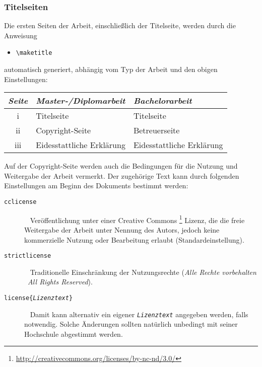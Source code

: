 \subsubsection{Titelseiten}

Die ersten Seiten der Arbeit, einschließlich der Titelseite,
werden durch die Anweisung
\begin{itemize}
\item[] \verb!\maketitle!  
\end{itemize}
automatisch generiert, abhängig vom Typ der Arbeit und den obigen
Einstellungen:
%
\begin{center}
\begin{tabular}{cll}
\emph{Seite} & \emph{Master-/Diplomarbeit} & \emph{Bachelorarbeit} \\
  \hline
  {\rm i} & Titelseite & Titelseite \\
  {\rm ii} & Copyright-Seite & Betreuerseite \\
  {\rm iii} & Eidesstattliche Erklärung & Eidesstattliche Erklärung \\
  \hline
\end{tabular}
\end{center}
%
Auf der Copyright-Seite werden auch die Bedingungen für die Nutzung 
und Weitergabe der Arbeit vermerkt. Der zugehörige Text kann durch
folgenden Einstellungen am Beginn des Dokuments bestimmt werden:
%
\begin{description}
\item[\normalfont\texttt{{\bs}cclicense}] ~ \newline
	Veröffentlichung unter einer Creative Commons%
	\footnote{\url{http://creativecommons.org/licenses/by-nc-nd/3.0/}}
	Lizenz, die die freie Weitergabe der Arbeit unter Nennung des Autors, jedoch
	keine kommerzielle Nutzung oder Bearbeitung erlaubt
	(Standardeinstellung).
\item[\normalfont\texttt{{\bs}strictlicense}] ~ \newline 
	Traditionelle Einschränkung der Nutzungsrechte 
	(\emph{Alle Rechte vorbehalten} \bzw\ \emph{All Rights Reserved}).
\item[\normalfont\texttt{{\bs}license\{\emph{Lizenztext}\}}] ~ \newline
	Damit kann alternativ ein eigener \texttt{\emph{Lizenztext}} angegeben werden, 
	falls notwendig. Solche Änderungen sollten natürlich unbedingt mit seiner 
	Hochschule abgestimmt werden.
\end{description}





